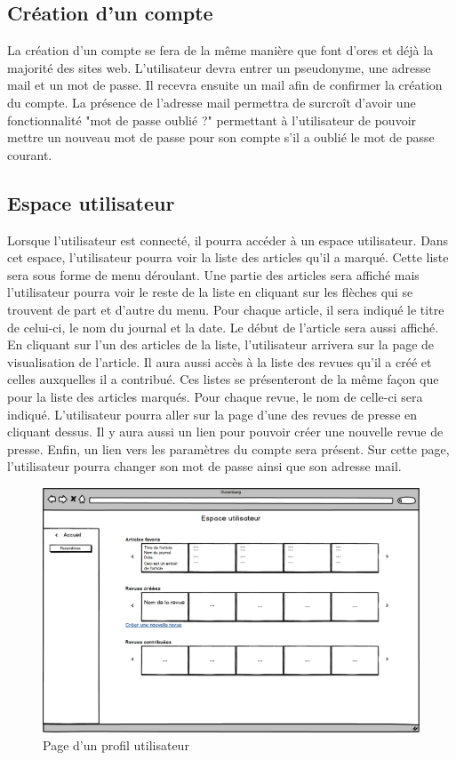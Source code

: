 \subsection{Création d'un compte}
\label{creation_compte}


La création d'un compte se fera de la même manière que font d'ores et déjà la majorité des sites web. L'utilisateur devra entrer un pseudonyme, une adresse mail et un mot de passe. Il recevra ensuite un mail afin de confirmer la création du compte. La présence de l'adresse mail permettra de surcroît d'avoir une fonctionnalité "mot de passe oublié ?" permettant à l'utilisateur de pouvoir mettre un nouveau mot de passe pour son compte s'il a oublié le mot de passe courant.


\subsection{Espace utilisateur}
\label{espace_util}

Lorsque l'utilisateur est connecté, il pourra accéder à un espace utilisateur. Dans cet espace, l'utilisateur pourra voir la liste des articles qu'il a marqué. Cette liste sera sous forme de menu déroulant. Une partie des articles sera affiché mais l'utilisateur pourra voir le reste de la liste en cliquant sur les flèches qui se trouvent de part et d'autre du menu. Pour chaque article, il sera indiqué le titre de celui-ci, le nom du journal et la date. Le début de l'article sera aussi affiché. En cliquant sur l'un des articles de la liste, l'utilisateur arrivera sur la page de visualisation de l'article.
Il aura aussi accès à la liste des revues qu'il a créé et celles auxquelles il a contribué. Ces listes se présenteront de la même façon que pour la liste des articles marqués. Pour chaque revue, le nom de celle-ci sera indiqué. L'utilisateur pourra aller sur la page d'une des revues de presse en cliquant dessus.
Il y aura aussi un lien pour pouvoir créer une nouvelle revue de presse. 
Enfin, un lien vers les paramètres du compte sera présent. Sur cette page, l'utilisateur pourra changer son mot de passe ainsi que son adresse mail.

    \begin{figure}[H]
        \centering
        \includegraphics[width=\textwidth]{figures/Utilisateur.png}
            \caption{Page d'un profil utilisateur}
            \label{fig:utilisateur}
    \end{figure}

